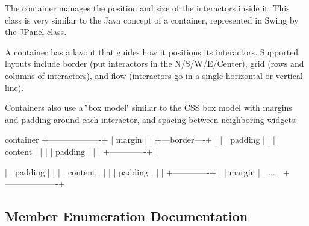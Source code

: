 The container manages the position and size of the interactors inside it. This class is very similar to the Java concept of a container, represented in Swing by the J\+Panel class.

A container has a layout that guides how it positions its interactors. Supported layouts include border (put interactors in the N/\+S/\+W/\+E/\+Center), grid (rows and columns of interactors), and flow (interactors go in a single horizontal or vertical line).

Containers also use a \char`\"{}box model\char`\"{} similar to the C\+SS box model with margins and padding around each interactor, and spacing between neighboring widgets\+:


\begin{DoxyPre}
 container
+-------------------+
|      margin       |
|  +---border----+  |
|  |   padding   |  |
|  |   content   |  |
|  |   padding   |  |
|  +-------------+  |
\tabulinesep=1mm

|  |   padding   |  |
|  |   content   |  |
|  |   padding   |  |
|  +-------------+  |
|      margin       |
|       ...         |
+-------------------+
\end{DoxyPre}
 

\subsection{Member Enumeration Documentation}
\mbox{\label{classGContainer_a1b7da28ed84c0763e8f92cde2df4799b}} 
